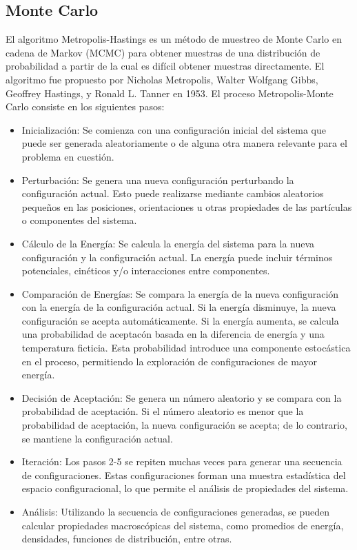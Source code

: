 \subsection{Monte Carlo}

El algoritmo Metropolis-Hastings es un m\'etodo de muestreo de Monte Carlo en cadena de Markov (MCMC)  para obtener muestras de una distribuci\'on de probabilidad a partir de la cual es dif\'icil obtener muestras directamente. El algoritmo fue propuesto por Nicholas Metropolis, Walter Wolfgang Gibbs, Geoffrey Hastings, y Ronald L. Tanner en 1953. \cite{metropolis1953rosenbluth}
El proceso Metropolis-Monte Carlo consiste en los siguientes pasos:


\begin{itemize}
	

\item Inicializaci\'on: Se comienza con una configuraci\'on inicial del sistema que puede ser generada aleatoriamente o de alguna otra manera relevante para el problema en cuesti\'on.

\item Perturbaci\'on: Se genera una nueva configuraci\'on perturbando la configuraci\'on actual. Esto puede realizarse mediante cambios aleatorios peque\~nos en las posiciones, orientaciones u otras propiedades de las part\'iculas o componentes del sistema.

\item C\'alculo de la Energ\'ia: Se calcula la energ\'ia del sistema para la nueva configuraci\'on y la configuraci\'on actual. La energ\'ia puede incluir t\'erminos potenciales, cin\'eticos y/o interacciones entre componentes.

\item Comparaci\'on de Energ\'ias: Se compara la energ\'ia de la nueva configuraci\'on con la energ\'ia de la configuraci\'on actual. Si la energ\'ia disminuye, la nueva configuraci\'on se acepta autom\'aticamente. Si la energ\'ia aumenta, se calcula una probabilidad de aceptac\'on basada en la diferencia de energ\'ia y una temperatura ficticia. Esta probabilidad introduce una componente estoc\'astica en el proceso, permitiendo la exploraci\'on de configuraciones de mayor energ\'ia.

\item Decisi\'on de Aceptaci\'on: Se genera un n\'umero aleatorio y se compara con la probabilidad de aceptaci\'on. Si el n\'umero aleatorio es menor que la probabilidad de aceptaci\'on, la nueva configuraci\'on se acepta; de lo contrario, se mantiene la configuración actual.

\item Iteraci\'on: Los pasos 2-5 se repiten muchas veces para generar una secuencia de configuraciones. Estas configuraciones forman una muestra estad\'istica del espacio configuracional, lo que permite el an\'alisis de propiedades del sistema.

\item An\'alisis: Utilizando la secuencia de configuraciones generadas, se pueden calcular propiedades macrosc\'opicas del sistema, como promedios de energ\'ia, densidades, funciones de distribuci\'on, entre otras.
\end{itemize}

